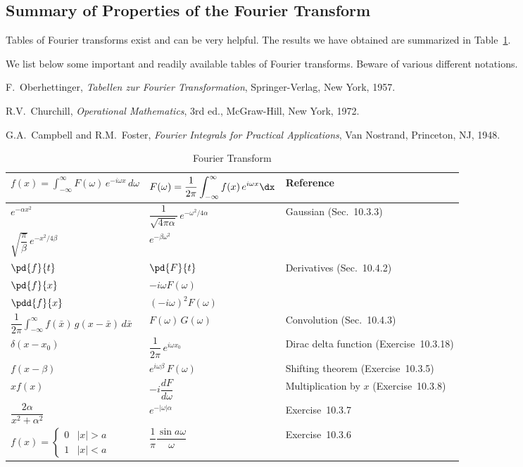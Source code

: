 \subsection{Summary of Properties of the Fourier Transform}
\label{subsec:ft-summary}

Tables of Fourier transforms exist and can be very helpful.  The results we have obtained are summarized in Table~\ref{tab:ft-summary}.

We list below some important and readily available tables of Fourier transforms.  Beware of various different notations.

F.~Oberhettinger, \textit{Tabellen zur Fourier Transformation}, Springer-Verlag, New York, 1957.

R.V.~Churchill, \textit{Operational Mathematics}, 3rd ed., McGraw-Hill, New York, 1972.

G.A.~Campbell and R.M.~Foster, \textit{Fourier Integrals for Practical Applications}, Van Nostrand, Princeton, NJ, 1948.

\begin{table}[H]
\centering
\caption{Fourier Transform}
\label{tab:ft-summary}
\begin{tabular}{lll}
\toprule
$f(x) = \displaystyle\int_{-\infty}^{\infty}F(\omega)\,e^{-i\omega x}\,d\omega$ & $F(\omega) = \displaystyle\frac{1}{2\pi}\int_{-\infty}^{\infty}f(x)\,e^{i\omega x}\dx$ & Reference \\
\midrule
$e^{-\alpha x^2}$ & $\dfrac{1}{\sqrt{4\pi\alpha}}\,e^{-\omega^2/4\alpha}$ & \multirow{2}{*}{Gaussian (Sec.~10.3.3)} \\[4pt]
$\sqrt{\dfrac{\pi}{\beta}}\,e^{-x^2/4\beta}$ & $e^{-\beta\omega^2}$ & \\[8pt]
$\pd{f}{t}$ & $\pd{F}{t}$ & \multirow{3}{*}{Derivatives (Sec.~10.4.2)} \\[4pt]
$\pd{f}{x}$ & $-i\omega F(\omega)$ & \\[4pt]
$\pdd{f}{x}$ & $(-i\omega)^2 F(\omega)$ & \\[8pt]
$\dfrac{1}{2\pi}\displaystyle\int_{-\infty}^{\infty}f(\bar{x})\,g(x-\bar{x})\,d\bar{x}$ & $F(\omega)\,G(\omega)$ & Convolution (Sec.~10.4.3) \\[8pt]
$\delta(x - x_0)$ & $\dfrac{1}{2\pi}\,e^{i\omega x_0}$ & Dirac delta function (Exercise~10.3.18) \\[4pt]
$f(x-\beta)$ & $e^{i\omega\beta}\,F(\omega)$ & Shifting theorem (Exercise~10.3.5) \\[4pt]
$xf(x)$ & $-i\dfrac{dF}{d\omega}$ & Multiplication by $x$ (Exercise~10.3.8) \\[4pt]
$\dfrac{2\alpha}{x^2+\alpha^2}$ & $e^{-|\omega|\alpha}$ & Exercise~10.3.7 \\[4pt]
$f(x) = \begin{cases} 0 & |x|>a \\ 1 & |x|<a \end{cases}$ & $\dfrac{1}{\pi}\dfrac{\sin a\omega}{\omega}$ & Exercise~10.3.6 \\
\bottomrule
\end{tabular}
\end{table}

